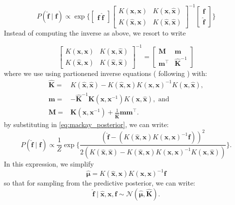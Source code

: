 \begin{equation}
\label{eq:mackay_posterior}
P(\hat{\mathbf{f}} \mid \mathbf{f}) 
\propto \exp\bigg\{
\begin{bmatrix}
\mathbf{f} \; 
\mathbf{\hat{f}}
\end{bmatrix}
\begin{bmatrix}
K(\mathbf{x},\mathbf{x})& K(\mathbf{x},\mathbf{\hat{x}})\\ 
K(\mathbf{\hat{x}},\mathbf{x})& K(\mathbf{\hat{x}},\mathbf{\hat{x}})
\end{bmatrix}^{-1}
\begin{bmatrix}
\mathbf{f} \\ 
\mathbf{\hat{f}}
\end{bmatrix}
\bigg\}
\end{equation}
Instead of computing the inverse as above, we resort to write 

\begin{equation}
\begin{bmatrix}
K(\mathbf{x},\mathbf{x})& K(\mathbf{x},\mathbf{\hat{x}})\\ 
K(\mathbf{\hat{x}},\mathbf{x})& K(\mathbf{\hat{x}},\mathbf{\hat{x}})
\end{bmatrix}^{-1}
=
\begin{bmatrix}
\mathbf{M}& \mathbf{m}\\ 
\mathbf{m}^\top & \mathbf{\hat{K}}^{-1} 
\end{bmatrix}
\end{equation}
where we use using partionened inverse equations (\citealp*{barnett1979matrix} following \citealp*{mackay1998introduction}) with:
\begin{align}
\mathbf{\hat{K}} =& K(\mathbf{\hat{x}},\mathbf{\hat{x}}) -K(\mathbf{\hat{x}},\mathbf{x}) K(\mathbf{x},\mathbf{x})^{-1}K(\mathbf{x},\mathbf{\hat{x}}),\\
\mathbf{m} =& -\mathbf{\hat{K}}^{-1} \mathbf{K}(\mathbf{x},\mathbf{x}^{-1}) K(\mathbf{x},\mathbf{\hat{x}}),\text{ and}\\
\mathbf{M} =&  \mathbf{K}(\mathbf{x},\mathbf{x}^{-1}) + \frac{1}{\mathbf{\hat{K}}}\mathbf{m}\mathbf{m}^\top.
\end{align}
by substituting in \ref{eq:mackay_posterior}, we can write:
\begin{equation}
P(\hat{\mathbf{f}} \mid \mathbf{f}) 
\propto \frac{1}{Z} 
\exp\bigg\{
\frac{(\mathbf{\hat{f}} - (K(\mathbf{\hat{x}},\mathbf{x}) K(\mathbf{x},\mathbf{x})^{-1}\mathbf{f}))^2}{2(K(\mathbf{\hat{x}},\mathbf{\hat{x}}) -K(\mathbf{\hat{x}},\mathbf{x}) K(\mathbf{x},\mathbf{x})^{-1}K(\mathbf{x},\mathbf{\hat{x}}))}
\bigg\}.
\end{equation} 
In this expression, we simplify 
\begin{equation}
\bm{\hat{\mu}} = K(\mathbf{\hat{x}},\mathbf{x}) K(\mathbf{x},\mathbf{x})^{-1}\mathbf{f}
\end{equation}
so that for sampling from the predictive posterior, we can write:
\begin{equation}
\mathbf{\hat{f}} \mid \mathbf{\hat{x}},\mathbf{x},\mathbf{f} 
\sim \mathcal{N}(\bm{\hat{\mu}},\mathbf{\hat{K}}).
\end{equation}

